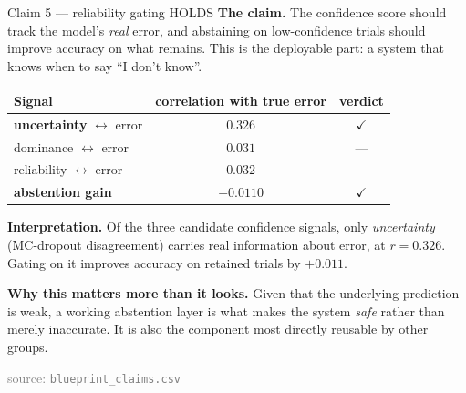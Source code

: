 \documentclass[aspectratio=169,11pt]{beamer}
\newcommand{\yes}{\textcolor{good}{\ensuremath{\checkmark}}}
\newcommand{\src}[1]{{\scriptsize\textcolor{gray}{source: \texttt{#1}}}}
\begin{document}
\begin{frame}{Claim 5 --- reliability gating \quad \textcolor{good}{HOLDS}}
\textbf{The claim.} The confidence score should track the model's \emph{real}
error, and abstaining on low-confidence trials should improve accuracy on what
remains. This is the deployable part: a system that knows when to say ``I don't
know''.

\begin{center}\small
\begin{tabular}{lcc}
\toprule
Signal & correlation with true error & verdict \\
\midrule
\textbf{uncertainty} $\leftrightarrow$ error & $\mathbf{0.326}$ & \yes \\
dominance $\leftrightarrow$ error            & $0.031$ & --- \\
reliability $\leftrightarrow$ error          & $0.032$ & --- \\
\midrule
\textbf{abstention gain} & $\mathbf{+0.0110}$ & \yes \\
\bottomrule
\end{tabular}
\end{center}

\vspace{0.6em}
\textbf{Interpretation.} Of the three candidate confidence signals, only
\emph{uncertainty} (MC-dropout disagreement) carries real information about
error, at $r=0.326$. Gating on it improves accuracy on retained trials by
$+0.011$.

\vspace{0.5em}
\textbf{Why this matters more than it looks.} Given that the underlying
prediction is weak, a working abstention layer is what makes the system
\emph{safe} rather than merely inaccurate. It is also the component most directly
reusable by other groups.

\vspace{0.3em}
\src{blueprint\_claims.csv}
\end{frame}
\end{document}
